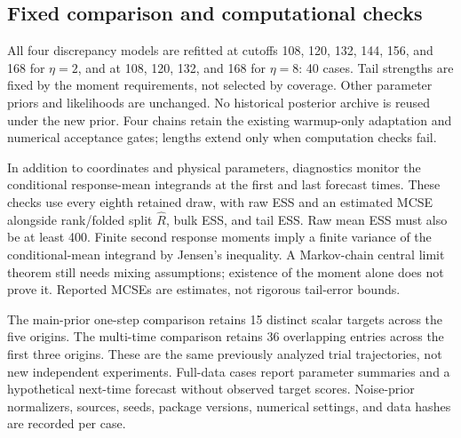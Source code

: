 \subsection{Fixed comparison and computational checks}

    All four discrepancy models are refitted at cutoffs 108, 120, 132, 144,
    156, and 168 for \(\eta=2\), and at 108, 120, 132, and 168 for
    \(\eta=8\): 40 cases. Tail strengths are fixed by the moment requirements,
    not selected by coverage. Other parameter priors and likelihoods are
    unchanged. No historical posterior archive is reused under the new prior.
    Four chains retain the existing warmup-only adaptation and numerical
    acceptance gates; lengths extend only when computation checks fail.

    In addition to coordinates and physical parameters, diagnostics monitor
    the conditional response-mean integrands at the first and last forecast
    times. These checks use every eighth retained draw, with raw ESS and an
    estimated MCSE alongside rank/folded split \(\widehat R\), bulk ESS,
    and tail ESS. Raw mean ESS must also be at least 400. Finite second
    response moments imply a finite variance of the conditional-mean
    integrand by Jensen's inequality. A Markov-chain central limit theorem
    still needs mixing assumptions; existence of the moment alone does not
    prove it. Reported MCSEs are estimates, not rigorous tail-error bounds.

    The main-prior one-step comparison retains 15 distinct scalar targets
    across the five origins. The multi-time comparison retains 36 overlapping
    entries across the first three origins. These are the same previously
    analyzed trial trajectories, not new independent experiments. Full-data
    cases report parameter summaries and a hypothetical next-time forecast
    without observed target scores. Noise-prior normalizers, sources, seeds,
    package versions, numerical settings, and data hashes are recorded per case.



